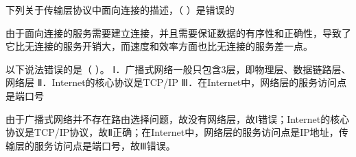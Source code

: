 \question 下列关于传输层协议中面向连接的描述，（ ）是错误的
\par{}
\begin{solution}由于面向连接的服务需要建立连接，并且需要保证数据的有序性和正确性，导致了它比无连接的服务开销大，而速度和效率方面也比无连接的服务差一点。
\end{solution}
\question 以下说法错误的是（ ）。
Ⅰ．广播式网络一般只包含3层，即物理层、数据链路层、网络层
Ⅱ．Internet的核心协议是TCP/IP
Ⅲ．在Internet中，网络层的服务访问点是端口号
\par{}
\begin{solution}由于广播式网络并不存在路由选择问题，故没有网络层，故Ⅰ错误；Internet的核心协议是TCP/IP协议，故Ⅱ正确；在Internet中，网络层的服务访问点是IP地址，传输层的服务访问点是端口号，故Ⅲ错误。
\end{solution}
